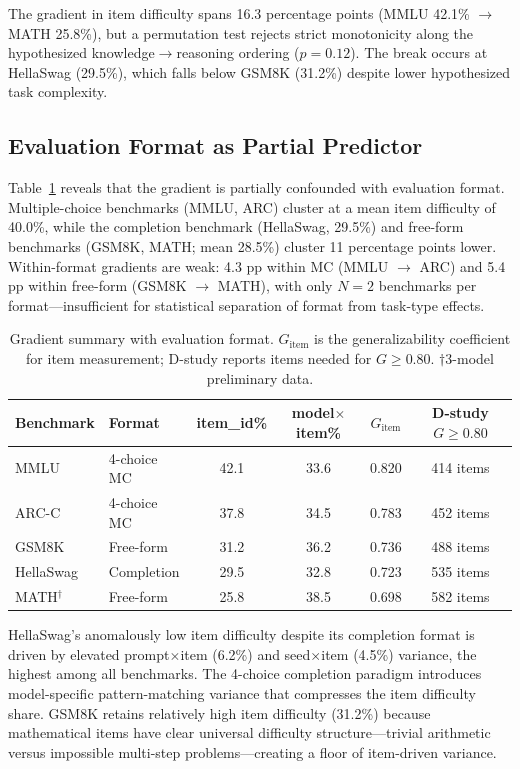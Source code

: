 \documentclass[11pt]{article}
\begin{document}
The gradient in item difficulty spans 16.3 percentage points (MMLU 42.1\% $\to$ MATH 25.8\%), but a permutation test rejects strict monotonicity along the hypothesized knowledge$\to$reasoning ordering ($p = 0.12$).
The break occurs at HellaSwag (29.5\%), which falls below GSM8K (31.2\%) despite lower hypothesized task complexity.

\subsection{Evaluation Format as Partial Predictor}

Table~\ref{tab:gradient_format} reveals that the gradient is partially confounded with evaluation format.
Multiple-choice benchmarks (MMLU, ARC) cluster at a mean item difficulty of 40.0\%, while the completion benchmark (HellaSwag, 29.5\%) and free-form benchmarks (GSM8K, MATH; mean 28.5\%) cluster 11 percentage points lower.
Within-format gradients are weak: 4.3 pp within MC (MMLU $\to$ ARC) and 5.4 pp within free-form (GSM8K $\to$ MATH), with only $N = 2$ benchmarks per format---insufficient for statistical separation of format from task-type effects.

\begin{table}[t]
\centering
\caption{Gradient summary with evaluation format. $G_{\text{item}}$ is the generalizability coefficient for item measurement; D-study reports items needed for $G \geq 0.80$. $\dagger$3-model preliminary data.}
\label{tab:gradient_format}
\small
\begin{tabular}{@{}llcccc@{}}
\toprule
Benchmark & Format & item\_id\% & model$\times$item\% & $G_{\text{item}}$ & D-study $G{\geq}0.80$ \\
\midrule
MMLU       & 4-choice MC    & 42.1 & 33.6 & 0.820 & 414 items \\
ARC-C      & 4-choice MC    & 37.8 & 34.5 & 0.783 & 452 items \\
GSM8K      & Free-form      & 31.2 & 36.2 & 0.736 & 488 items \\
HellaSwag  & Completion     & 29.5 & 32.8 & 0.723 & 535 items \\
MATH$^\dagger$ & Free-form  & 25.8 & 38.5 & 0.698 & 582 items \\
\bottomrule
\end{tabular}
\end{table}

HellaSwag's anomalously low item difficulty despite its completion format is driven by elevated prompt$\times$item (6.2\%) and seed$\times$item (4.5\%) variance, the highest among all benchmarks.
The 4-choice completion paradigm introduces model-specific pattern-matching variance that compresses the item difficulty share.
GSM8K retains relatively high item difficulty (31.2\%) because mathematical items have clear universal difficulty structure---trivial arithmetic versus impossible multi-step problems---creating a floor of item-driven variance.
\end{document}
